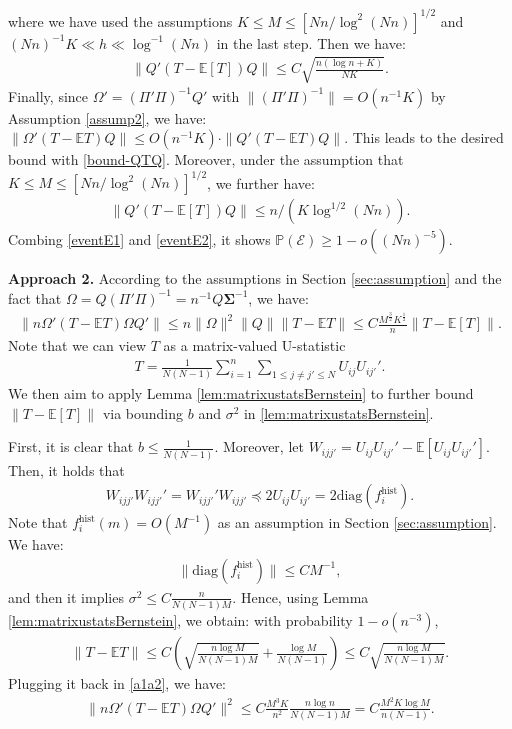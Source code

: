 \documentclass[preprint,11pt]{article}
\newcommand{\mbb}{\mathbb}
\newcommand{\mcal}{\mathcal}
\numberwithin{equation}{section}
\newcommand{\diag}{\mathrm{diag}}
\begin{document}
where we have used the assumptions $K\leq M\leq [Nn/\log^2(Nn)]^{1/2}$ and $ (Nn)^{-1}K\ll h\ll \log^{-1}(Nn)$ in the last step. Then we have:
\begin{align}\label{bound-QTQ}
    \|Q'(T-\mbb{E}[T])Q\|\le C\sqrt{\frac{n(\log n+K)}{NK}}.
\end{align}
Finally, since $\Omega'=(\Pi'\Pi)^{-1}Q'$ with $\|(\Pi'\Pi)^{-1}\|=O(n^{-1}K)$ by Assumption \ref{assump2}, we have: $\|\Omega'(T-\mathbb{E}T)Q\|\leq O(n^{-1}K)\cdot \|Q'(T-\mathbb{E}T)Q\|$. This leads to the desired bound with \eqref{bound-QTQ}. Moreover, under the assumption that $K\leq M\leq [Nn/\log^2(Nn)]^{1/2}$, we further have:
\begin{align}\label{eventE2}
    \|Q'(T-\mbb{E}[T])Q\|\leq n/(K\log^{1/2}(Nn)).
\end{align}
Combing \eqref{eventE1} and \eqref{eventE2}, it shows $\mbb{P}(\mcal{E})\ge 1-o((Nn)^{-5})$.


\iffalse
\textbf{Approach 2.} According to the assumptions in Section \ref{sec:assumption} and the fact that $\Omega=Q(\Pi'\Pi)^{-1}=n^{-1}Q\bm{\Sigma}^{-1}$, we have:
\begin{align}\label{a1a2}
    \|n\Omega'(T-\mathbb{E}T)\Omega Q'\|\le n\|\Omega\|^2\|Q\|\|T-\mathbb{E}T\|\le C\frac{M^{\frac{3}{2}}K^{\frac{1}{2}}}{n}\|T-\mbb{E}[T]\|.
\end{align}
Note that we can view $T$ as a matrix-valued U-statistic
\begin{align*}
    T=\frac{1}{N(N-1)}\sum_{i=1}^n\sum_{1\le j\neq j'\le N}U_{ij}U_{ij'}'.
\end{align*}
We then aim to apply Lemma \ref{lem:matrixustatsBernstein} to further bound $\|T-\mbb{E}[T]\|$ via bounding $b$ and $\sigma^2$ in \ref{lem:matrixustatsBernstein}. 

First, it is clear that $b\le \frac{1}{N(N-1)}$. Moreover, let $W_{ijj'}=U_{ij}U_{ij'}'-\mbb{E}[U_{ij}U_{ij'}']$. Then, it holds that
\begin{align*}
    W_{ijj'}W_{ijj'}'=W_{ijj'}'W_{ijj'}\preceq 2U_{ij}U_{ij'}=2\diag(f_i^{\text{hist}}).
\end{align*}
Note that $f_i^{\text{hist}}(m)=O(M^{-1})$ as an assumption in Section \ref{sec:assumption}. We have:
\begin{align*}
    \|\diag(f_i^{\text{hist}})\|\le CM^{-1},
\end{align*}
and then it implies $\sigma^2\le C\frac{n}{N(N-1)M}$. Hence, using Lemma \ref{lem:matrixustatsBernstein}, we obtain: with probability $1-o(n^{-3})$,
\begin{align*}
    \|T-\mbb{E}T\|\le C\left(\sqrt{\frac{n\log M}{N(N-1)M}}+\frac{\log M}{N(N-1)}\right)\le C\sqrt{\frac{n\log M}{N(N-1)M}}.
\end{align*}
Plugging it back in \eqref{a1a2}, we have:
\begin{align*}
    \|n\Omega'(T-\mathbb{E}T)\Omega Q'\|^2\le C\frac{M^3K}{n^2}\frac{n\log n}{N(N-1)M}=C\frac{M^2K\log M}{n(N-1)}.
\end{align*}
\end{document}
